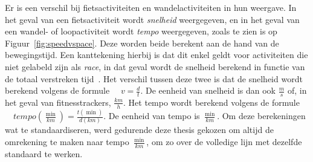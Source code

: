 Er is een verschil bij fietsactiviteiten en wandelactiviteiten in hun weergave.
In het geval van een fietsactiviteit wordt \textit{snelheid} weergegeven, en in
het geval van een wandel- of loopactiviteit wordt \textit{tempo} weergegeven,
zoals te zien is op Figuur~\ref{fig:speedvspace}. Deze worden beide berekent
aan de hand van de bewegingstijd. Een kanttekening hierbij is dat dit enkel
geldt voor activiteiten die niet gelabeld zijn als \textit{race}, in dat geval
wordt de snelheid berekend in functie van de totaal verstreken
tijd~\cite{MovingTi80:online}. Het verschil tussen deze twee is dat de snelheid
wordt berekend volgens de formule $ \quad v = \frac{d}{t}$. De eenheid van
snelheid is dan ook $\frac{m}{s}$ of, in het geval van fitnesstrackers,
$\frac{km}{h}$. Het tempo wordt berekend volgens de formule $ \quad
    tempo(\frac{\min}{km}) = \frac{t(\min)}{d(km)}$. De eenheid van tempo is
$\frac{\min}{km}$. Om deze berekeningen wat te standaardiseren, werd gedurende
deze thesis gekozen om altijd de omrekening te maken naar tempo
$\frac{\min}{km}$, om zo over de volledige lijn met dezelfde standaard te
werken.
